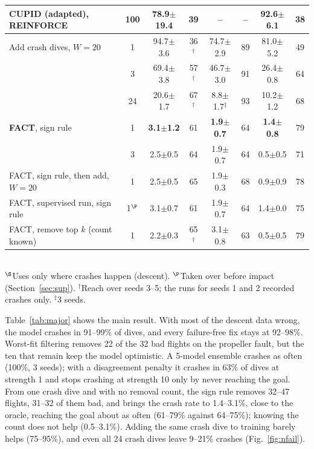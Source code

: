 \documentclass[preprint,12pt]{elsarticle}
\newcommand{\method}{FACT}
\newcommand{\pmse}[2]{#1{\scriptsize$\pm$#2}}
\begin{document}
\begin{table}[t]
\begin{tabular}{@{}lccccccc@{}}
CUPID (adapted), REINFORCE & 100 & \pmse{78.9}{19.4} & 39 & -- & -- & \pmse{92.6}{6.1} & 38 \\
\midrule
Add crash dives, $W=20$ & 1 & \pmse{94.7}{3.6} & 36$^\dagger$ & \pmse{74.7}{2.9} & 89 & \pmse{81.0}{5.2} & 49 \\
 & 3 & \pmse{69.4}{3.8} & 57$^\dagger$ & \pmse{46.7}{3.0} & 91 & \pmse{26.4}{0.8} & 64 \\
 & 24 & \pmse{20.6}{1.7} & 67$^\dagger$ & \pmse{8.8}{1.7}$^\ddagger$ & 93 & \pmse{10.2}{1.2} & 68 \\
\midrule
\textbf{\method{}}, sign rule & 1 & \textbf{\pmse{3.1}{1.2}} & 61 & \textbf{\pmse{1.9}{0.7}} & 64 & \textbf{\pmse{1.4}{0.8}} & 79 \\
 & 3 & \pmse{2.5}{0.5} & 64 & \pmse{1.9}{0.7} & 64 & \pmse{0.5}{0.5} & 71 \\
\method{}, sign rule, then add, $W=20$ & 1 & \pmse{2.5}{0.5} & 65 & \pmse{1.9}{0.3} & 68 & \pmse{0.9}{0.9} & 78 \\
\method{}, supervised run, sign rule & 1$^\P$ & \pmse{3.1}{0.7} & 61 & \pmse{1.9}{0.7} & 64 & \pmse{1.4}{0.0} & 75 \\
\method{}, remove top $k$ (count known) & 1 & \pmse{2.2}{0.3} & 65$^\dagger$ & \pmse{3.1}{0.8} & 63 & \pmse{0.5}{0.5} & 79 \\
\bottomrule
\end{tabular}\\[2pt]
\footnotesize $^\S$Uses only where crashes happen (descent). $^\P$Taken over before impact (Section~\ref{sec:sup}). $^\dagger$Reach over seeds 3--5; the runs for seeds 1 and 2 recorded crashes only. $^\ddagger$3 seeds.
\end{table}

Table~\ref{tab:major} shows the main result. With most of the descent data wrong, the model crashes in 91--99\% of dives, and every failure-free fix stays at 92--98\%. Worst-fit filtering removes 22 of the 32 bad flights on the propeller fault, but the ten that remain keep the model optimistic. A 5-model ensemble crashes as often (100\%, 3 seeds); with a disagreement penalty it crashes in 63\% of dives at strength 1 and stops crashing at strength 10 only by never reaching the goal. From one crash dive and with no removal count, the sign rule removes 32--47 flights, 31--32 of them bad, and brings the crash rate to 1.4--3.1\%, close to the oracle, reaching the goal about as often (61--79\% against 64--75\%); knowing the count does not help (0.5--3.1\%). Adding the same crash dive to training barely helps (75--95\%), and even all 24 crash dives leave 9--21\% crashes (Fig.~\ref{fig:nfail}).
\end{document}
